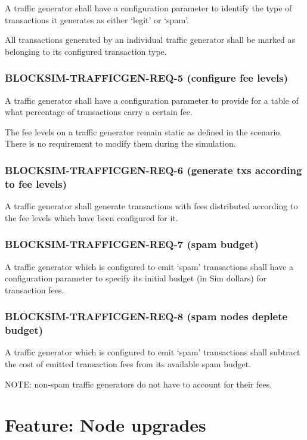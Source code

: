 \documentclass{scrreprt}
\begin{document}
A traffic generator shall have a configuration parameter to
identify the type of transactions it generates as either `legit' or `spam'.

All transactions generated by an individual traffic generator shall
be marked as belonging to its configured transaction type.


\subsubsection{BLOCKSIM-TRAFFICGEN-REQ-5 (configure fee levels)}

A traffic generator shall have a configuration parameter to
provide for a table of what percentage of transactions carry a certain fee.

The fee levels on a traffic generator remain static as defined in the scenario.
There is no requirement to modify them during the simulation.


\subsubsection{BLOCKSIM-TRAFFICGEN-REQ-6 (generate txs according to fee levels)}

A traffic generator shall generate transactions with fees distributed
according to the fee levels which have been configured for it.


\subsubsection{BLOCKSIM-TRAFFICGEN-REQ-7 (spam budget)}

A traffic generator which is configured to emit `spam' transactions
shall have a configuration parameter to specify its initial budget
(in Sim dollars) for transaction fees.


\subsubsection{BLOCKSIM-TRAFFICGEN-REQ-8 (spam nodes deplete budget)}

A traffic generator which is configured to emit `spam' transactions
shall subtract the cost of emitted transaction fees from its available
spam budget.

NOTE: non-spam traffic generators do not have to account for their fees.




\section{Feature: Node upgrades}
\end{document}
